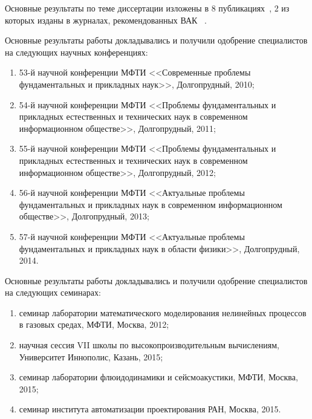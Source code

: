 Основные результаты по теме диссертации изложены в 8 публикациях~\cite{skalko2014, tsybulin2015a, tsybulin2015b, miptconf53,miptconf54,miptconf55,miptconf56,miptconf57},
2 из которых изданы в журналах, рекомендованных ВАК~\cite{skalko2014,tsybulin2015a}%
.

Основные результаты работы докладывались и получили одобрение специалистов на следующих научных конференциях:
\begin{enumerate}
\item 53-й научной конференции МФТИ <<Современные проблемы фундаментальных и прикладных наук>>, Долгопрудный, 2010;
\item 54-й научной конференции МФТИ <<Проблемы фундаментальных и прикладных естественных и технических наук в современном информационном обществе>>, Долгопрудный, 2011;
\item 55-й научной конференции МФТИ <<Проблемы фундаментальных и прикладных естественных и технических наук в современном информационном обществе>>, Долгопрудный, 2012;
\item 56-й научной конференции МФТИ <<Актуальные проблемы фундаментальных и прикладных наук в современном информационном обществе>>, Долгопрудный, 2013;
\item 57-й научной конференции МФТИ <<Актуальные проблемы фундаментальных и прикладных наук в области физики>>, Долгопрудный, 2014.
\end{enumerate}

Основные результаты работы докладывались и получили одобрение специалистов на следующих семинарах:
\begin{enumerate}
\item семинар лаборатории математического моделирования нелинейных процессов в газовых средах, МФТИ, Москва, 2012;
\item научная сессия VII школы по высокопроизводительным вычислениям, Университет Иннополис, Казань, 2015;
\item семинар лаборатории флюидодинамики и сейсмоакустики, МФТИ, Москва, 2015;
\item семинар института автоматизации проектирования РАН, Москва, 2015.
\end{enumerate}
